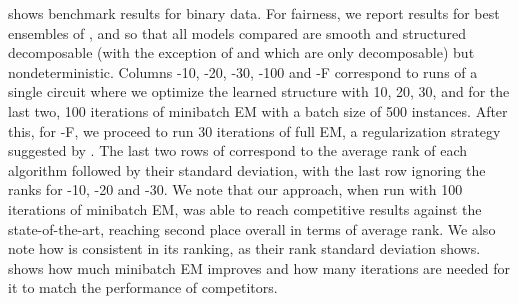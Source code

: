  shows benchmark results for binary data. For fairness, we report results for best
ensembles of ,  and  so that all models
compared are smooth and structured decomposable (with the exception of  and
 which are only decomposable) but nondeterministic. Columns
-10, -20, -30, -100 and
-F correspond to runs of a single  circuit where we optimize
the learned structure with 10, 20, 30, and for the last two, 100 iterations of minibatch EM with a
batch size of 500 instances. After this, for -F, we proceed to run 30 iterations
of full EM, a regularization strategy suggested by \citet{liu21}. The last two rows of
 correspond to the average rank of each algorithm followed by their standard
deviation, with the last row ignoring the ranks for -10, -20
and -30. We note that our approach, when run with 100 iterations of minibatch EM,
was able to reach competitive results against the state-of-the-art, reaching second place overall
in terms of average rank. We also note how  is consistent in its ranking, as
their rank standard deviation shows.  shows how much minibatch EM
improves  and how many iterations are needed for it to match the performance of
competitors.

